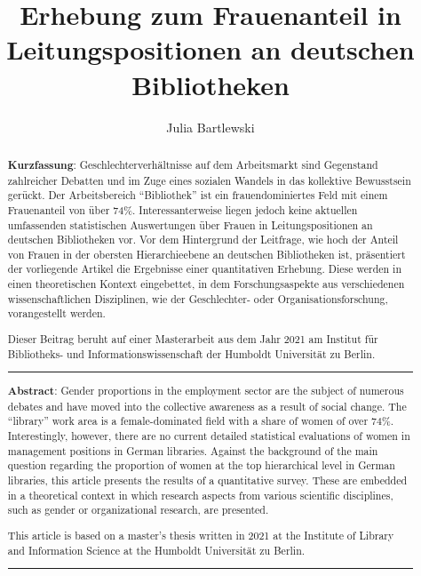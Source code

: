 \documentclass[a4paper,
fontsize=11pt,
oneside,
numbers=noperiodatend,
parskip=half-,
bibliography=totoc,
final
]{scrartcl}
\title{\LARGE{Erhebung zum Frauenanteil in Leitungspositionen an deutschen Bibliotheken}}%
\author{Julia Bartlewski} %
\date{}
\begin{document}
\maketitle
\thispagestyle{fancyplain} 

\begin{abstract}
\noindent
\textbf{Kurzfassung}: Geschlechterverhältnisse auf dem Arbeitsmarkt sind Gegenstand zahlreicher Debatten und im Zuge eines sozialen Wandels in das kollektive Bewusstsein gerückt. Der Arbeitsbereich \enquote{Bibliothek} ist ein frauendominiertes Feld mit einem Frauenanteil von über 74\%. Interessanterweise liegen jedoch keine aktuellen umfassenden statistischen Auswertungen über Frauen in Leitungspositionen an deutschen Bibliotheken vor. Vor dem Hintergrund der Leitfrage, wie hoch der Anteil von Frauen in der obersten Hierarchieebene an deutschen Bibliotheken ist, präsentiert der vorliegende Artikel die Ergebnisse einer quantitativen Erhebung. Diese werden in einen theoretischen Kontext eingebettet, in dem Forschungsaspekte aus verschiedenen wissenschaftlichen Disziplinen, wie der Geschlechter- oder Organisationsforschung, vorangestellt werden.

Dieser Beitrag beruht auf einer Masterarbeit aus dem Jahr 2021 am Institut für Bibliotheks- und Informationswissenschaft der Humboldt Universität zu Berlin.

\begin{center}\rule{0.5\linewidth}{0.5pt}\end{center}


\textbf{Abstract}: Gender proportions in the employment sector are the subject of numerous debates and have moved into the collective awareness as a result of social change. The \enquote{library} work area is a female-dominated field with a share of women of over 74\%. Interestingly, however, there are no current detailed statistical evaluations of women in management positions in German libraries. Against the background of the main question regarding the proportion of women at the top hierarchical level in German libraries, this article presents the results of a quantitative survey. These are embedded in a theoretical context in which research aspects from various scientific disciplines, such as gender or organizational research, are presented.

This article is based on a master's thesis written in 2021 at the Institute of Library and Information Science at the Humboldt Universität zu Berlin.

\begin{center}\rule{0.5\linewidth}{0.5pt}\end{center}
\end{abstract}
\end{document}
